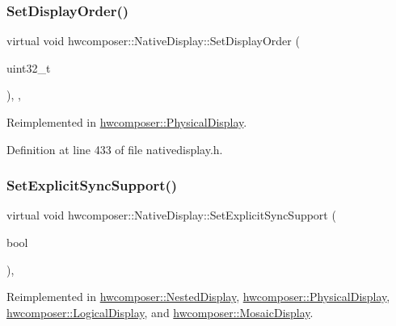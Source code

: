\subsubsection{\texorpdfstring{Set\+Display\+Order()}{SetDisplayOrder()}}
{\footnotesize\ttfamily virtual void hwcomposer\+::\+Native\+Display\+::\+Set\+Display\+Order (\begin{DoxyParamCaption}\item[{uint32\+\_\+t}]{ }\end{DoxyParamCaption})\hspace{0.3cm}{\ttfamily [inline]}, {\ttfamily [protected]}, {\ttfamily [virtual]}}



Reimplemented in \mbox{\hyperlink{classhwcomposer_1_1PhysicalDisplay_ae5d26a97e43c84a53d396ca946afbbef}{hwcomposer\+::\+Physical\+Display}}.



Definition at line 433 of file nativedisplay.\+h.


\begin{DoxyCode}{0}
\end{DoxyCode}
\mbox{\label{classhwcomposer_1_1NativeDisplay_a986975322078e900da95f78be42ad88b}} 
\subsubsection{\texorpdfstring{Set\+Explicit\+Sync\+Support()}{SetExplicitSyncSupport()}}
{\footnotesize\ttfamily virtual void hwcomposer\+::\+Native\+Display\+::\+Set\+Explicit\+Sync\+Support (\begin{DoxyParamCaption}\item[{bool}]{ }\end{DoxyParamCaption})\hspace{0.3cm}{\ttfamily [inline]}, {\ttfamily [virtual]}}



Reimplemented in \mbox{\hyperlink{classhwcomposer_1_1NestedDisplay_a9567352fc212a0e9a4530183a9ec96ea}{hwcomposer\+::\+Nested\+Display}}, \mbox{\hyperlink{classhwcomposer_1_1PhysicalDisplay_a995cabfaf5aca42854711dacef743373}{hwcomposer\+::\+Physical\+Display}}, \mbox{\hyperlink{classhwcomposer_1_1LogicalDisplay_aafa5f07e92a828651f2d66b09df4896d}{hwcomposer\+::\+Logical\+Display}}, and \mbox{\hyperlink{classhwcomposer_1_1MosaicDisplay_af9053256b801c0334bd89ed7b5e97912}{hwcomposer\+::\+Mosaic\+Display}}.



